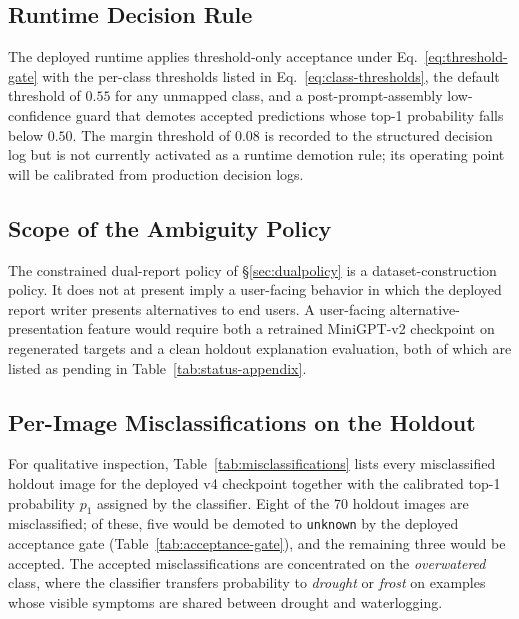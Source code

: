 \subsection{Runtime Decision Rule}

The deployed runtime applies threshold-only acceptance under
Eq.~\ref{eq:threshold-gate} with the per-class thresholds listed in
Eq.~\ref{eq:class-thresholds}, the default threshold of $0.55$ for any
unmapped class, and a post-prompt-assembly low-confidence guard that
demotes accepted predictions whose top-1 probability falls below
$0.50$. The margin threshold of $0.08$ is recorded to the structured
decision log but is not currently activated as a runtime demotion rule;
its operating point will be calibrated from production decision logs.

\subsection{Scope of the Ambiguity Policy}

The constrained dual-report policy of \S\ref{sec:dualpolicy} is a
dataset-construction policy. It does not at present imply a user-facing
behavior in which the deployed report writer presents alternatives to
end users. A user-facing alternative-presentation feature would require
both a retrained MiniGPT-v2 checkpoint on regenerated targets and a
clean holdout explanation evaluation, both of which are listed as
pending in Table~\ref{tab:status-appendix}.

\subsection{Per-Image Misclassifications on the Holdout}

For qualitative inspection, Table~\ref{tab:misclassifications} lists
every misclassified holdout image for the deployed v4 checkpoint
together with the calibrated top-1 probability $p_1$ assigned by the
classifier. Eight of the 70 holdout images are misclassified; of these,
five would be demoted to \texttt{unknown} by the deployed acceptance
gate (Table~\ref{tab:acceptance-gate}), and the remaining three would
be accepted. The accepted misclassifications are concentrated on the
\emph{overwatered} class, where the classifier transfers probability to
\emph{drought} or \emph{frost} on examples whose visible symptoms are
shared between drought and waterlogging.

\begin{table}[H]
\centering
\caption{Misclassified holdout images for the deployed v4 checkpoint.
$p_1$ is the calibrated top-1 probability assigned by the classifier;
images with $p_1$ below the per-class acceptance threshold $\tau_c$
(Eq.~\ref{eq:class-thresholds}) or below the $0.50$ post-prompt-assembly
floor are demoted to \texttt{unknown} by the deployed runtime gate.}
\label{tab:misclassifications}

\end{table}

